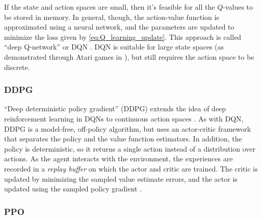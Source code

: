 \documentclass[twocolumn, aps, 10pt]{revtex4-2}
\begin{document}
If the state and action spaces are small, then it's feasible for all the $Q$-values to be stored in memory. In general, though, the action-value function is approximated using a neural network, and the parameters are updated to minimize the loss given by \ref{eq:Q_learning_update}. This approach is called ``deep Q-network'' or DQN \cite{mnih2013playing}. DQN is suitable for large state spaces (as demonstrated through Atari games in \cite{mnih2013playing}), but still requires the action space to be discrete.

\subsubsection{DDPG}

``Deep deterministic policy gradient'' (DDPG) extends the idea of deep reinforcement learning in DQNs to continuous action spaces \cite{lillicrap2015continuous}. As with DQN, DDPG is a model-free, off-policy algorithm, but uses an actor-critic framework that separates the policy and the value function estimators. In addition, the policy is deterministic, so it returns a single action instead of a distribution over actions. As the agent interacts with the environment, the experiences are recorded in a \emph{replay buffer} on which the actor and critic are trained. The critic is updated by minimizing the sampled value estimate errors,
and the actor is updated using the sampled policy gradient%
.

\subsubsection{PPO}
\end{document}
